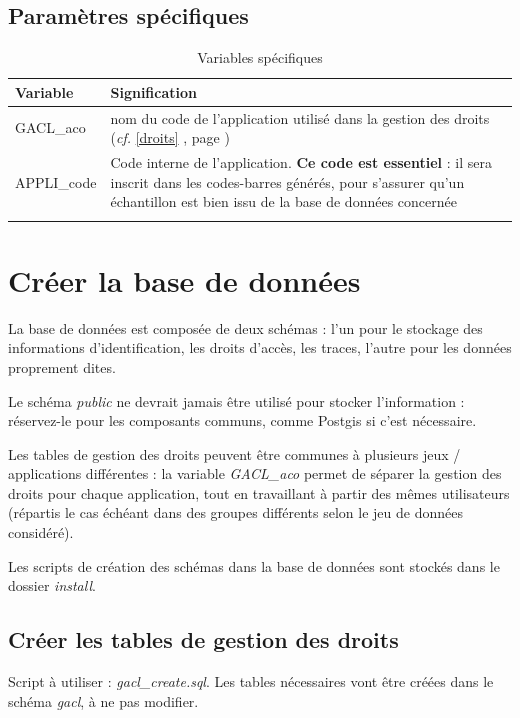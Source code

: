 \subsection{Paramètres spécifiques}
\label{paramspec}

\begin{longtable}{|p{5cm}|p{10cm}|}
\hline
\textbf{Variable} & \textbf{Signification} \\
\hline
\endhead
GACL\_aco & nom du code de l'application utilisé dans la gestion des droits (\textit{cf.} \ref{droits} \textit{\nameref{droits}}, page \pageref{droits} )\\
\hline
APPLI\_code & Code interne de l'application. \textbf{Ce code est essentiel} : il sera inscrit dans les codes-barres générés, pour s'assurer qu'un échantillon est bien issu de la base de données concernée\\
\hline
\caption{Variables spécifiques}
\end{longtable}

\section{Créer la base de données}

La base de données est composée de deux schémas : l'un pour le stockage des informations d'identification, les droits d'accès, les traces, l'autre pour les données proprement dites.

Le schéma \textit{public} ne devrait jamais être utilisé pour stocker l'information : réservez-le pour les composants communs, comme Postgis si c'est nécessaire.

Les tables de gestion des droits peuvent être communes à plusieurs jeux / applications différentes : la variable \textit{GACL\_aco} permet de séparer la gestion des droits pour chaque application, tout en travaillant à partir des mêmes utilisateurs (répartis le cas échéant dans des groupes différents selon le jeu de données considéré).

Les scripts de création des schémas dans la base de données sont stockés dans le dossier \textit{install}. 



\subsection{Créer les tables de gestion des droits}
Script à utiliser : \textit{gacl\_create.sql}. Les tables nécessaires vont être créées dans le schéma \textit{gacl}, à ne pas modifier.

